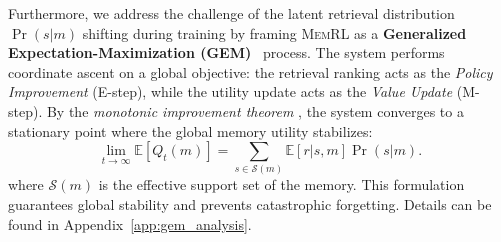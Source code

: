 \documentclass{article}
\theoremstyle{plain}
\theoremstyle{definition}
\theoremstyle{remark}
\begin{document}
Furthermore, we address the challenge of the latent retrieval distribution $\Pr(s|m)$ shifting during training by framing \textsc{MemRL} as a \textbf{Generalized Expectation-Maximization (GEM)}~\citep{dempster1977maximum} process. The system performs coordinate ascent on a global objective: the retrieval ranking acts as the \textit{Policy Improvement} (E-step), while the utility update acts as the \textit{Value Update} (M-step). By the \textit{monotonic improvement theorem} \citep{neal1998view}, the system converges to a stationary point where the global memory utility stabilizes:
\begin{equation}
\lim_{t \to \infty} \mathbb{E}[Q_t(m)] 
= \sum_{s \in \mathcal{S}(m)} \mathbb{E}[r | s, m] \Pr(s | m).
\end{equation}
where $\mathcal{S}(m)$ is the effective support set of the memory. This formulation guarantees global stability and prevents catastrophic forgetting. Details can be found in Appendix~\ref{app:gem_analysis}.




\end{document}
